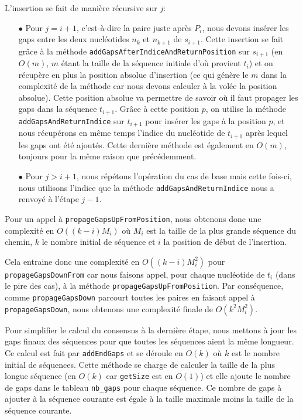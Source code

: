 L'insertion se fait de manière récursive sur $j$:
\begin{itemize}
	\item[$\bullet$] Pour $j = i + 1$, c'est-à-dire la paire juste après $P_{i}$, nous
		devons insérer les gaps entre les deux nucléotides $n_{k}$ et $n_{k +
		1}$ de $s_{i + 1}$. Cette insertion se fait grâce à la méthode
		\verb|addGapsAfterIndiceAndReturnPosition| sur $s_{i + 1}$ (en $O(m)$,
		$m$ étant la taille de la séquence initiale d'où provient $t_{i}$) et on
		récupère en plus la position absolue d'insertion (ce qui génère le $m$
		dans la complexité de la méthode car nous devons calculer à la volée la
		position absolue). Cette position absolue va permettre de savoir où il
		faut propager les gaps dans la séquence $t_{i + 1}$. Grâce à cette
		position $p$, on utilise la méthode \verb|addGapsAndReturnIndice| sur $t_{i
		+ 1}$ pour insérer les gaps à la position $p$, et nous récupérons en
		même temps l'indice du nucléotide de $t_{i + 1}$ après lequel les gaps
		ont été ajoutés. Cette dernière méthode est également en $O(m)$,
		toujours pour la même raison que précédemment.
	\item[$\bullet$] Pour $j > i + 1$, nous répétons l'opération du cas de base mais cette
		fois-ci, nous utilisons l'indice que la méthode
		\verb|addGapsAndReturnIndice| nous a renvoyé à l'étape $j - 1$.
\end{itemize}

Pour un appel à \verb|propageGapsUpFromPosition|, nous obtenons donc une
complexité en $O( (k - i) M_{i})$ où $M_{i}$ est la taille de la plus grande
séquence du chemin, $k$ le nombre initial de séquence et $i$ la position de
début de l'insertion.

Cela entraine donc une complexité en $O( (k - i) M_{i}^{2})$ pour
\verb|propageGapsDownFrom| car nous faisons appel, pour chaque nucléotide de
$t_{i}$ (dans le pire des cas), à la méthode \-\verb|propageGapsUpFromPosition|.
Par conséquence, comme \verb|propageGapsDown| parcourt toutes les paires en
faisant appel à \verb|propageGapsDown|, nous obtenons une complexité finale de
$O(k^{2} M_{i}^{2})$.

Pour simplifier le calcul du consensus à la dernière étape, nous mettons à jour
les gaps finaux des séquences pour que toutes les séquences aient la même
longueur. Ce calcul est fait par \verb|addEndGaps| et se déroule en $O(k)$ où
$k$ est le nombre initial de séquences. Cette méthode se charge de calculer la
taille de la plus longue séquence (en $O(k)$ car \verb|getSize| est en $O(1)$)
et elle ajoute le nombre de gaps dans le tableau \verb|nb_gaps| pour chaque
séquence. Ce nombre de gaps à ajouter à la séquence courante est égale à la
taille maximale moins la taille de la séquence courante.

